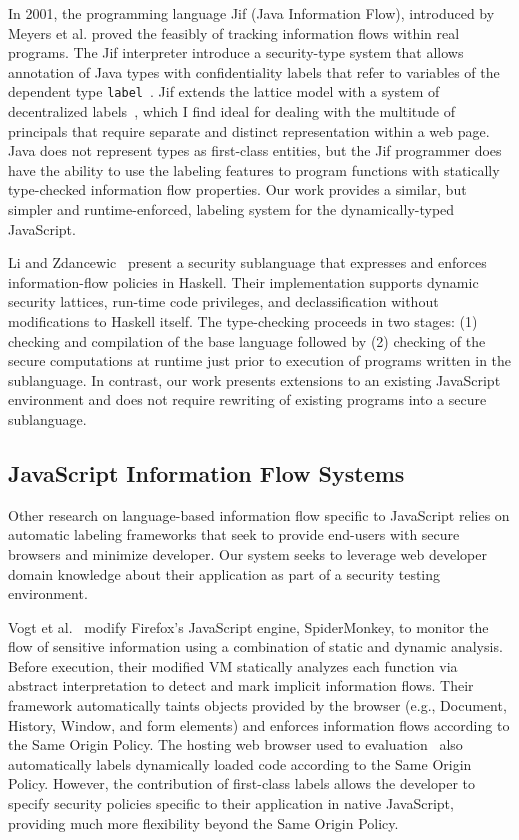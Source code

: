 In 2001, the programming language Jif (Java Information Flow), introduced by Meyers et al.\cite{jif} proved the feasibly of tracking information flows within real programs.
The Jif interpreter introduce a security-type system that allows annotation of Java types with confidentiality labels that refer to variables of the dependent type \texttt{label}~\cite{sabelfeld.myers+03}.
Jif extends the lattice model with a system of decentralized labels~\cite{myers.liskov+00}, which I find ideal for dealing with the multitude of principals that require separate and distinct representation within a web page.
Java does not represent types as first-class entities, but the Jif programmer does have the ability to use the labeling features to program functions with statically type-checked information flow properties.
Our work provides a similar, but simpler and runtime-enforced, labeling system for the dynamically-typed JavaScript.

Li and Zdancewic~\cite{li.zdancewic+06} present a security sublanguage that expresses and enforces information-flow policies in Haskell.
Their implementation supports dynamic security lattices, run-time code privileges, and declassification without modifications to Haskell itself.
The type-checking proceeds in two stages: (1) checking and compilation of the base language followed by (2) checking of the secure computations at runtime just prior to execution of programs written in the sublanguage.
In contrast, our work presents extensions to an existing JavaScript environment and does not require rewriting of existing programs into a secure sublanguage.

\subsection{JavaScript Information Flow Systems}

Other research on language-based information flow specific to JavaScript relies on automatic labeling frameworks that seek to provide end-users with secure browsers and minimize developer.
Our system seeks to leverage web developer domain knowledge about their application as part of a security testing environment.

Vogt et al.~\cite{vogt.etal+07} modify Firefox's JavaScript engine, SpiderMonkey, to monitor the flow of sensitive information using a combination of static and dynamic analysis.
Before execution, their modified VM statically analyzes each function via abstract interpretation to detect and mark implicit information flows.
Their framework automatically taints objects provided by the browser (e.g., Document, History, Window, and form elements) and enforces information flows according to the Same Origin Policy.
The hosting web browser used to evaluation \FlowCore\ also automatically labels dynamically loaded code according to the Same Origin Policy.
However, the contribution of first-class labels allows the developer to specify security policies specific to their application in native JavaScript, providing much more flexibility beyond the Same Origin Policy.

